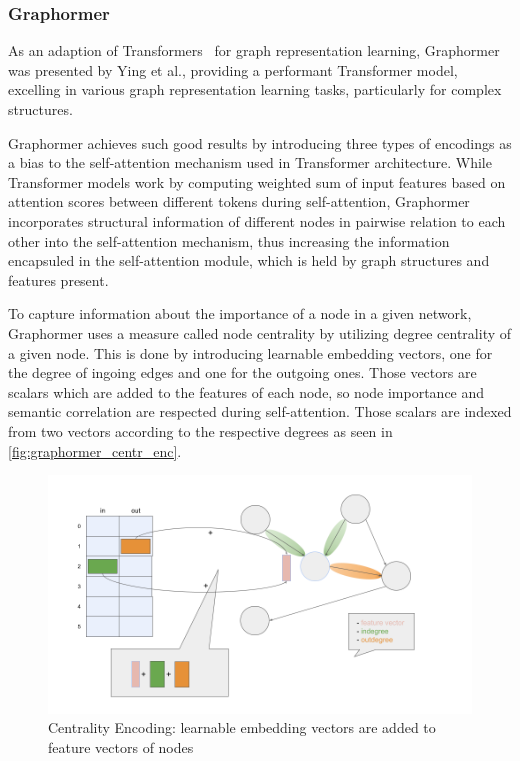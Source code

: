 \subsubsection{Graphormer}
As an adaption of Transformers~\cite{vaswani2017attention} for graph representation learning, Graphormer~\cite{2021graphormer} was presented by Ying et al., providing a performant Transformer model, excelling in various graph representation learning tasks, particularly for complex structures.

Graphormer achieves such good results by introducing three types of encodings as a bias to the self-attention mechanism used in Transformer architecture. While Transformer models work by computing weighted sum of input features based on attention scores between different tokens during self-attention, Graphormer incorporates structural information of different nodes in pairwise relation to each other into the self-attention mechanism, thus increasing the information encapsuled in the self-attention module, which is held by graph structures and features present.

To capture information about the importance of a node in a given network, Graphormer uses a measure called node centrality by utilizing degree centrality of a given node. This is done by introducing learnable embedding vectors, one for the degree of ingoing edges and one for the outgoing ones. Those vectors are scalars which are added to the features of each node, so node importance and semantic correlation are respected during self-attention. Those scalars are indexed from two vectors according to the respective degrees as seen in \autoref{fig:graphormer_centr_enc}.

\begin{figure}[h!]
    \centering
    \includegraphics[scale=0.35]{tex/res/graphormer_centr_enc.png}
    \caption{Centrality Encoding: learnable embedding vectors are added to feature vectors of nodes}
    \label{fig:graphormer_centr_enc}
\end{figure}

